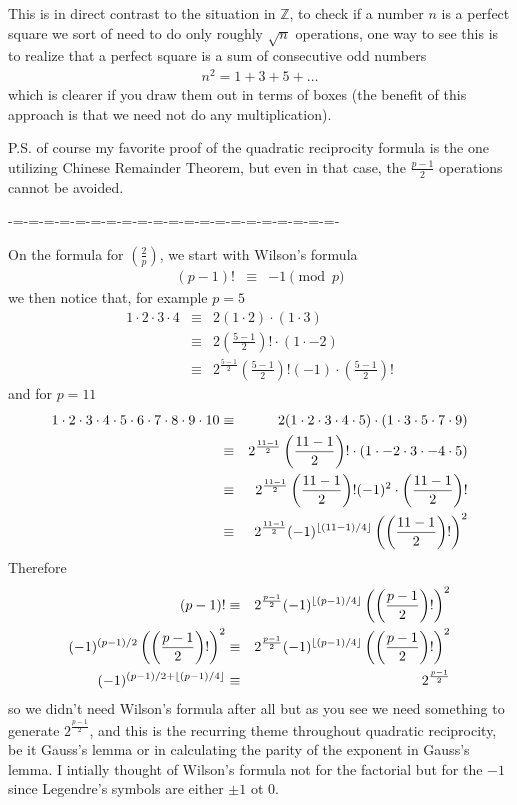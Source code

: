 \documentclass[aps,preprint,preprintnumbers,nofootinbib,showpacs,prd]{revtex4-1}
\newcommand{\nbea}{\begin{eqnarray*}}
\newcommand{\neea}{\end{eqnarray*}}
\DeclarePairedDelimiter{\floor}{\lfloor}{\rfloor}
\begin{document}
This is in direct contrast to the situation in $\mathbb{Z}$, to check if a number $n$ is a perfect square we sort of need to do only roughly $\sqrt{n}$ operations, one way to see this is to realize that a perfect square is a sum of consecutive odd numbers
%
\nbea
n^2 = 1 + 3 + 5 + \dots
\neea
%
which is clearer if you draw them out in terms of boxes (the benefit of this approach is that we need not do any multiplication).

P.S. of course my favorite proof of the quadratic reciprocity formula is the one utilizing Chinese Remainder Theorem, but even in that case, the $\frac{p-1}{2}$ operations cannot be avoided.

-=-=-=-=-=-=-=-=-=-=-=-=-=-=-=-=-=-=-=-=-=-

On the formula for $\left(\frac{2}{p}\right)$, we start with Wilson's formula
%
\nbea
(p-1)! & \equiv & -1 \pmod{p}
\neea
%
we then notice that, for example $p=5$
%
\nbea
1\cdot2\cdot3\cdot4 & \equiv & 2 (1\cdot 2) \cdot (1 \cdot 3) \\
& \equiv & 2 \left ( \frac{5-1}{2}\right)! \cdot (1\cdot-2) \\
& \equiv & 2^{\frac{5-1}{2}} \left ( \frac{5-1}{2}\right)! (-1)\cdot \left ( \frac{5-1}{2}\right)!
\neea
%
and for $p=11$
%
\nbea
1\cdot2\cdot3\cdot4 \cdot 5\cdot 6\cdot 7\cdot 8\cdot 9\cdot 10 & \equiv & 2 (1\cdot 2\cdot 3\cdot4 \cdot 5) \cdot (1 \cdot 3 \cdot 5\cdot 7\cdot 9) \\
& \equiv & 2^{\frac{11-1}{2}} \left ( \frac{11-1}{2}\right)! \cdot (1\cdot-2\cdot 3 \cdot-4 \cdot 5) \\
& \equiv & 2^{\frac{11-1}{2}} \left ( \frac{11-1}{2}\right)! (-1)^2\cdot \left ( \frac{11-1}{2}\right)! \\
& \equiv & 2^{\frac{11-1}{2}} (-1)^{\floor{(11-1)/4}} \left (\left ( \frac{11-1}{2}\right)!\right)^2
\neea
%
Therefore
%
\nbea
(p-1)! & \equiv & 2^{\frac{p-1}{2}} (-1)^{\floor{(p-1)/4}} \left (\left ( \frac{p-1}{2}\right)!\right)^2 \\
(-1)^{(p-1)/2} \left (\left ( \frac{p-1}{2}\right)!\right)^2 & \equiv & 2^{\frac{p-1}{2}} (-1)^{\floor{(p-1)/4}} \left (\left ( \frac{p-1}{2}\right)!\right)^2 \\
(-1)^{(p-1)/2 + \floor{(p-1)/4}} & \equiv & 2^{\frac{p-1}{2}}
\neea
%
so we didn't need Wilson's formula after all but as you see we need something to generate $2^{\frac{p-1}{2}}$, and this is the recurring theme throughout quadratic reciprocity, be it Gauss's lemma or in calculating the parity of the exponent in Gauss's lemma. I intially thought of Wilson's formula not for the factorial but for the $-1$ since Legendre's symbols are either $\pm1$ ot 0.
\end{document}

